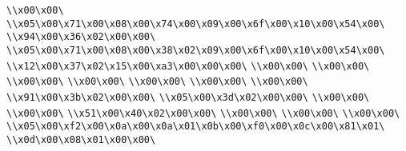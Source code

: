 \verb|\\x00\x00\|\newline
\verb|\\x05\x00\x71\x00\x08\x00\x74\x00\x09\x00\x6f\x00\x10\x00\x54\x00\|\newline
\verb|\\x94\x00\x36\x02\x00\x00\|\newline
\verb|\\x05\x00\x71\x00\x08\x00\x38\x02\x09\x00\x6f\x00\x10\x00\x54\x00\|\newline
\verb|\\x12\x00\x37\x02\x15\x00\xa3\x00\x00\x00\|\newline
\verb|\\x00\x00\|\newline
\verb|\\x00\x00\|\newline
\verb|\\x00\x00\|\newline
\verb|\\x00\x00\|\newline
\verb|\\x00\x00\|\newline
\verb|\\x00\x00\|\newline
\verb|\\x00\x00\|\newline
\verb|\\x91\x00\x3b\x02\x00\x00\|\newline
\verb|\\x05\x00\x3d\x02\x00\x00\|\newline
\verb|\\x00\x00\|\newline
\verb|\\x00\x00\|\newline
\verb|\\x51\x00\x40\x02\x00\x00\|\newline
\verb|\\x00\x00\|\newline
\verb|\\x00\x00\|\newline
\verb|\\x00\x00\|\newline
\verb|\\x05\x00\xf2\x00\x0a\x00\x0a\x01\x0b\x00\xf0\x00\x0c\x00\x81\x01\|\newline
\verb|\\x0d\x00\x08\x01\x00\x00\|\newline
